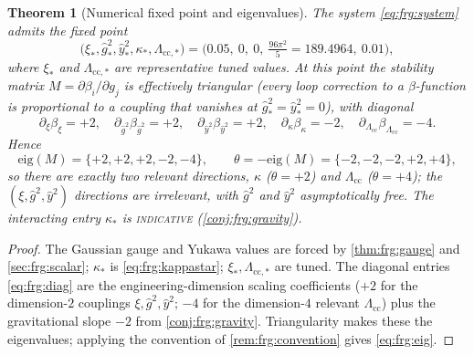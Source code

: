\documentclass[11pt]{article}
\theoremstyle{plain}
\newtheorem{theorem}{Theorem}[section]
\theoremstyle{definition}
\theoremstyle{remark}
\begin{document}
\begin{theorem}[Numerical fixed point and eigenvalues]
\label{thm:frg:fixedpoint}
The system \eqref{eq:frg:system} admits the fixed point
\begin{equation}\label{eq:frg:fpvalues}
  \bigl(\xi_{\ast},\hat g^{2}_{\ast},\hat y^{2}_{\ast},
        \kappa_{\ast},\Lambda_{\mathrm{cc},\ast}\bigr)
  =\bigl(0.05,\ 0,\ 0,\ \tfrac{96\pi^{2}}{5}=189.4964,\ 0.01\bigr),
\end{equation}
where $\xi_{\ast}$ and $\Lambda_{\mathrm{cc},\ast}$ are representative
tuned values. At this point the stability matrix
$M=\partial\beta_{i}/\partial g_{j}$ is effectively triangular (every loop
correction to a $\beta$-function is proportional to a coupling that
vanishes at $\hat g^{2}_{\ast}=\hat y^{2}_{\ast}=0$), with diagonal
\begin{equation}\label{eq:frg:diag}
  \partial_{\xi}\beta_{\xi}=+2,\quad
  \partial_{\hat g^{2}}\beta_{\hat g^{2}}=+2,\quad
  \partial_{\hat y^{2}}\beta_{\hat y^{2}}=+2,\quad
  \partial_{\kappa}\beta_{\kappa}=-2,\quad
  \partial_{\Lambda_{\mathrm{cc}}}\beta_{\Lambda_{\mathrm{cc}}}=-4 .
\end{equation}
Hence
\begin{equation}\label{eq:frg:eig}
  \mathrm{eig}(M)=\{+2,+2,+2,-2,-4\},
  \qquad
  \theta=-\mathrm{eig}(M)=\{-2,-2,-2,+2,+4\},
\end{equation}
so there are exactly two relevant directions, $\kappa$ ($\theta=+2$) and
$\Lambda_{\mathrm{cc}}$ ($\theta=+4$); the $(\xi,\hat g^{2},\hat y^{2})$
directions are irrelevant, with $\hat g^{2}$ and $\hat y^{2}$ asymptotically
free. The interacting entry $\kappa_{\ast}$ is \textsc{indicative}
(\autoref{conj:frg:gravity}).
\end{theorem}

\begin{proof}
The Gaussian gauge and Yukawa values are forced by \autoref{thm:frg:gauge}
and \autoref{sec:frg:scalar}; $\kappa_{\ast}$ is \eqref{eq:frg:kappastar};
$\xi_{\ast},\Lambda_{\mathrm{cc},\ast}$ are tuned. The diagonal entries
\eqref{eq:frg:diag} are the engineering-dimension scaling coefficients
($+2$ for the dimension-$2$ couplings $\xi,\hat g^{2},\hat y^{2}$; $-4$ for
the dimension-$4$ relevant $\Lambda_{\mathrm{cc}}$) plus the gravitational
slope $-2$ from \autoref{conj:frg:gravity}. Triangularity makes these the
eigenvalues; applying the convention of \autoref{rem:frg:convention} gives
\eqref{eq:frg:eig}.
\end{proof}
\end{document}
